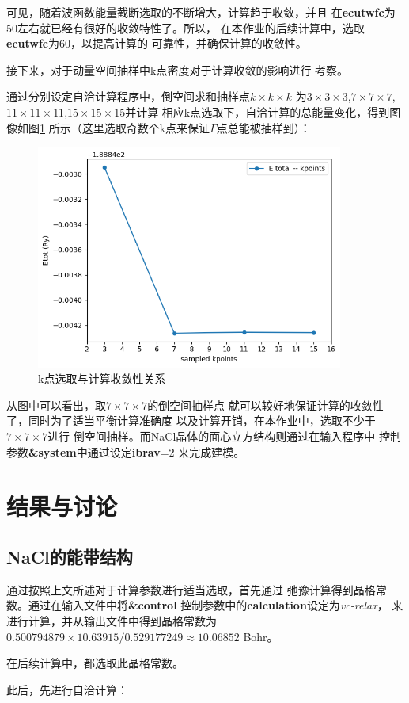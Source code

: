 \documentclass[UTF8]{ctexart}
\numberwithin{figure}{section}  %
\numberwithin{table}{section}
\numberwithin{equation}{section}
\begin{document}
        可见，随着波函数能量截断选取的不断增大，计算趋于收敛，并且
    在\textbf{ecutwfc}为50左右就已经有很好的收敛特性了。所以，
    在本作业的后续计算中，选取\textbf{ecutwfc}为60，以提高计算的
    可靠性，并确保计算的收敛性。\par 
        接下来，对于动量空间抽样中k点密度对于计算收敛的影响进行
    考察。\par 
        通过分别设定自洽计算程序中，倒空间求和抽样点$k\times k \times k$
    为$3\times 3\times 3$,$7\times 7\times 7$,
    $11\times 11\times 11$,$15\times 15\times 15$并计算
    相应k点选取下，自洽计算的总能量变化，得到图像如图\ref{Fig:4}
    所示（这里选取奇数个k点来保证$\Gamma$点总能被抽样到）：

    \begin{figure}[H]
        \centering
        \includegraphics[width=0.9\textwidth]{kpoints_converge.png}
        \caption{k点选取与计算收敛性关系}
        \label{Fig:4}
    \end{figure}

        从图中可以看出，取$7\times 7\times 7$的倒空间抽样点
    就可以较好地保证计算的收敛性了，同时为了适当平衡计算准确度
    以及计算开销，在本作业中，选取不少于$7\times 7\times 7$进行
    倒空间抽样。而NaCl晶体的面心立方结构则通过在输入程序中
    控制参数\textbf{\&system}中通过设定\textbf{ibrav}=2
    来完成建模。


\clearpage

\section{结果与讨论}

    \subsection{NaCl的能带结构}
        通过按照上文所述对于计算参数进行适当选取，首先通过
    弛豫计算得到晶格常数。通过在输入文件中将\textbf{\&control}
    控制参数中的\textbf{calculation}设定为\emph{vc-relax}，
    来进行计算，并从输出文件中得到晶格常数为
    $0.500794879 \times 10.63915 /  0.529177249 \approx 10.06852$
    Bohr。\par 
        在后续计算中，都选取此晶格常数。\par 
        此后，先进行自洽计算：
\end{document}
